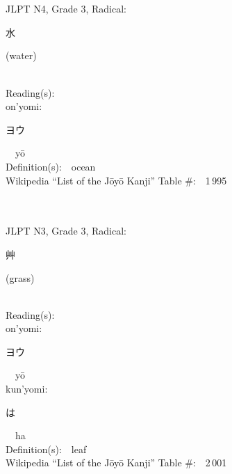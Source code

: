 \begin{multicols}{2}
\ \ \\
{\fontsize{34pt}{40pt}  }\ \ \\  %
{JLPT N4, Grade 3, Radical:\ \ {\begin{CJK}{UTF8}{min} 水 \end{CJK}} (water) } \\
Reading(s):\ \ \\
{\hspace*{1em}}on'yomi:\ \ \\
{\hspace*{2em}}{\begin{CJK}{UTF8}{min} ヨウ \end{CJK}}\ \ y\=o\ \ \\
Definition(s):\ \ ocean \\
Wikipedia ``List of the J\=oy\=o Kanji'' Table \#:\ \ 1\,995 \\
\ \ \\
{\fontsize{34pt}{40pt}  }\ \ \\  %
{JLPT N3, Grade 3, Radical:\ \ {\begin{CJK}{UTF8}{min} 艸 \end{CJK}} (grass) } \\
Reading(s):\ \ \\
{\hspace*{1em}}on'yomi:\ \ \\
{\hspace*{2em}}{\begin{CJK}{UTF8}{min} ヨウ \end{CJK}}\ \ y\=o\ \ \\
{\hspace*{1em}}kun'yomi:\ \ \\
{\hspace*{2em}}{\begin{CJK}{UTF8}{min} は \end{CJK}}\ \ ha\ \ \\
Definition(s):\ \ leaf \\
Wikipedia ``List of the J\=oy\=o Kanji'' Table \#:\ \ 2\,001 \\
\ \ \\
{\fontsize{34pt}{40pt}  }\ \ \\  %

\end{multicols}
